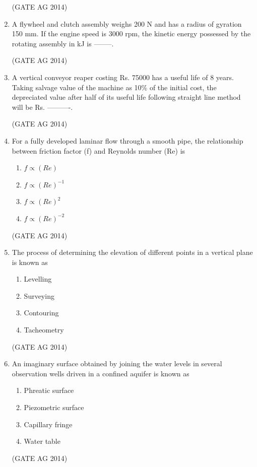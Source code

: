 \documentclass[journal,12pt,onecolumn]{IEEEtran}
\begin{document}
\begin{enumerate}
    \hfill(GATE AG 2014)

    \item A flywheel and clutch assembly weighs 200 N and has a radius of gyration 150 mm. If the engine speed is 3000 rpm, the kinetic energy possessed by the rotating assembly in kJ is --------.

    \hfill(GATE AG 2014)

    \item A vertical conveyor reaper costing Rs. 75000 has a useful life of 8 years. Taking salvage value of the machine as 10\% of the initial cost, the depreciated value after half of its useful life following straight line method will be Rs. ----------.

    \hfill(GATE AG 2014)

    \item For a fully developed laminar flow through a smooth pipe, the relationship between friction factor (f) and Reynolds number (Re) is
    \begin{multicols}{4}
    \begin{enumerate}
        \item $f \propto (Re)$
        \item $f \propto (Re)^{-1}$
        \item $f \propto (Re)^{2}$
        \item $f \propto (Re)^{-2}$
    \end{enumerate}
    \end{multicols}
    \hfill(GATE AG 2014)

    \item The process of determining the elevation of different points in a vertical plane is known as
    \begin{multicols}{4}
    \begin{enumerate}
        \item Levelling
        \item Surveying
        \item Contouring
        \item Tacheometry
    \end{enumerate}
    \end{multicols}
    \hfill(GATE AG 2014)

    \item An imaginary surface obtained by joining the water levels in several observation wells driven in a confined aquifer is known as
     \begin{multicols}{2}
    \begin{enumerate}
        \item Phreatic surface
        \item Piezometric surface
        \item Capillary fringe
        \item Water table
    \end{enumerate}
    \end{multicols}
    \hfill(GATE AG 2014)


\end{enumerate}
\end{document}

